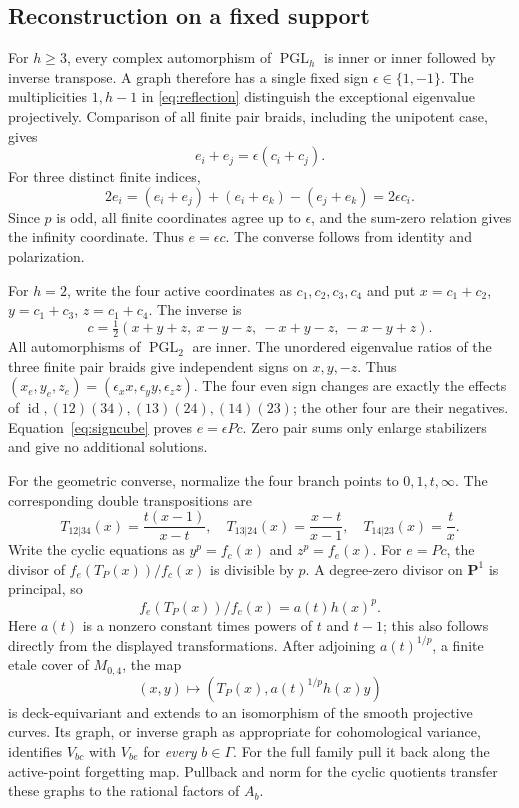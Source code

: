 \documentclass[11pt]{article}
\theoremstyle{definition}
\newcommand{\PGL}{\operatorname{PGL}}
\newcommand{\id}{\operatorname{id}}
\begin{document}
\subsection{Reconstruction on a fixed support}
For $h\geq3$, every complex automorphism of $\PGL_h$ is inner or inner
followed by inverse transpose. A graph therefore has a single fixed sign
$\epsilon\in\{1,-1\}$. The multiplicities $1,h-1$ in
\eqref{eq:reflection} distinguish the exceptional eigenvalue projectively.
Comparison of all finite pair braids, including the unipotent case, gives
\[
 e_i+e_j=\epsilon(c_i+c_j).
\]
For three distinct finite indices,
\[
 2e_i=(e_i+e_j)+(e_i+e_k)-(e_j+e_k)=2\epsilon c_i.
\]
Since $p$ is odd, all finite coordinates agree up to $\epsilon$, and the
sum-zero relation gives the infinity coordinate. Thus $e=\epsilon c$.
The converse follows from identity and polarization.

For $h=2$, write the four active coordinates as $c_1,c_2,c_3,c_4$ and put
$x=c_1+c_2$, $y=c_1+c_3$, $z=c_1+c_4$. The inverse is
\begin{equation}\label{eq:signcube}
 c=\tfrac12(x+y+z,\ x-y-z,\ -x+y-z,\ -x-y+z).
\end{equation}
All automorphisms of $\PGL_2$ are inner. The unordered eigenvalue ratios
of the three finite pair braids give independent signs on $x,y,-z$.
Thus $(x_e,y_e,z_e)=(\epsilon_x x,\epsilon_y y,\epsilon_z z)$.
The four even sign changes are exactly the effects of
$\id,(12)(34),(13)(24),(14)(23)$; the other four are their negatives.
Equation~\eqref{eq:signcube} proves $e=\epsilon Pc$. Zero pair sums only
enlarge stabilizers and give no additional solutions.

For the geometric converse, normalize the four branch points to
$0,1,t,\infty$. The corresponding double transpositions are
\[
 T_{12|34}(x)=\frac{t(x-1)}{x-t},\quad
 T_{13|24}(x)=\frac{x-t}{x-1},\quad
 T_{14|23}(x)=\frac{t}{x}.
\]
Write the cyclic equations as $y^p=f_c(x)$ and $z^p=f_e(x)$.
For $e=Pc$, the divisor of $f_e(T_P(x))/f_c(x)$ is divisible by $p$.
A degree-zero divisor on $\mathbf P^1$ is principal, so
\[
 f_e(T_P(x))/f_c(x)=a(t)h(x)^p.
\]
Here $a(t)$ is a nonzero constant times powers of $t$ and $t-1$; this
also follows directly from the displayed transformations. After adjoining
$a(t)^{1/p}$, a finite etale cover of $M_{0,4}$, the map
\[
 (x,y)\longmapsto(T_P(x),a(t)^{1/p}h(x)y)
\]
is deck-equivariant and extends to an isomorphism of the smooth projective
curves. Its graph, or inverse graph as appropriate for cohomological
variance, identifies $V_{bc}$ with $V_{be}$ for \emph{every} $b\in\Gamma$.
For the full family pull it back along the active-point forgetting map.
Pullback and norm for the cyclic quotients transfer these graphs to the
rational factors of $A_b$.
\end{document}
